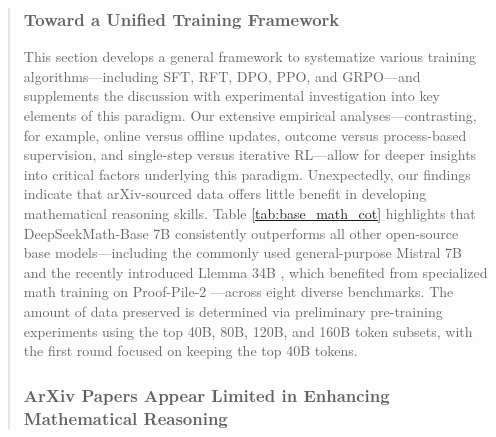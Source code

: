 \begin{abstract}
\subsubsection{Toward a Unified Training Framework} This section develops a general framework to systematize various training algorithms—including SFT, RFT, DPO, PPO, and GRPO—and supplements the discussion with experimental investigation into key elements of this paradigm. Our extensive empirical analyses—contrasting, for example, online versus offline updates, outcome versus process-based supervision, and single-step versus iterative RL—allow for deeper insights into critical factors underlying this paradigm. Unexpectedly, our findings indicate that arXiv-sourced data offers little benefit in developing mathematical reasoning skills. Table \ref{tab:base_math_cot} highlights that DeepSeekMath-Base 7B consistently outperforms all other open-source base models—including the commonly used general-purpose Mistral 7B \citep{mistral} and the recently introduced Llemma 34B \citep{llemma}, which benefited from specialized math training on Proof-Pile-2 \citep{llemma}—across eight diverse benchmarks. The amount of data preserved is determined via preliminary pre-training experiments using the top 40B, 80B, 120B, and 160B token subsets, with the first round focused on keeping the top 40B tokens. \subsubsection{ArXiv Papers Appear Limited in Enhancing Mathematical Reasoning}


\end{abstract}
